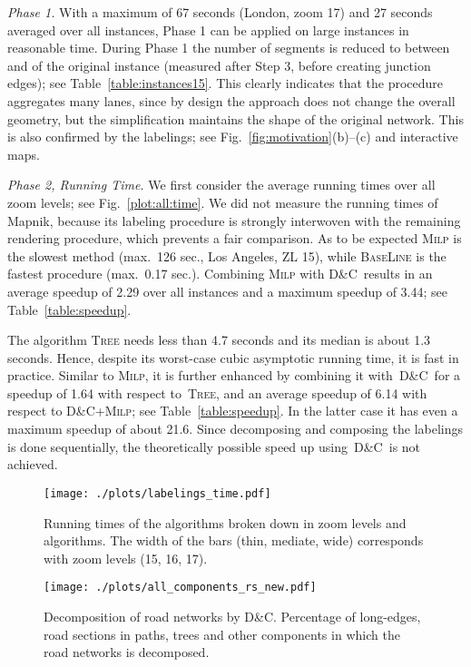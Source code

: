 \documentclass[a4paper,11pt]{article}
\newcommand{\GreedyAlgo}{\textsc{Base\-Line}\xspace}
\newcommand{\TreeAlgo}{\textsc{Tree}\xspace}
\newcommand{\ILPAlgo}{\textsc{Milp}\xspace}
\newcommand{\Shredder}{\textsc{D\&C}}
\begin{document}
\textit{Phase 1.}   With a maximum of 67 seconds (London,
zoom 17) and 27 seconds averaged over all instances, Phase 1 can be
applied on large instances in reasonable time. During Phase 1 the number of segments
is reduced to between  and  of the original instance (measured after Step 3, before creating junction edges); see
Table~\ref{table:instances15}. This clearly indicates that the
procedure aggregates many lanes, since by design the approach does not
change the overall geometry, but the simplification maintains the shape of the original network. This is also confirmed by the
labelings; see Fig.~\ref{fig:motivation}(b)--(c) and interactive maps.

\textit{Phase 2, Running Time.} We first consider the average
running times over all zoom levels; see Fig.~\ref{plot:all:time}. We
did not measure the running times of Mapnik, because its labeling
procedure is strongly interwoven with the remaining rendering
procedure, which prevents a fair comparison. As to be expected \ILPAlgo is the slowest method (max.\ 126
sec., Los Angeles, ZL 15), while \GreedyAlgo is the fastest procedure
(max.\ 0.17 sec.). Combining \ILPAlgo with \Shredder\ results in an
average speedup of 2.29 over all instances and a maximum speedup of
3.44; see Table~\ref{table:speedup}. 

The algorithm \TreeAlgo needs less than 4.7 seconds and its median is
about 1.3 seconds.  Hence, despite its worst-case cubic asymptotic
running time, it is fast in practice. Similar to \ILPAlgo, it is
further enhanced by combining it with~\Shredder\ for a speedup of 1.64
with respect to~\TreeAlgo, and an average speedup of 6.14 with respect
to \Shredder+\ILPAlgo; see Table~\ref{table:speedup}. In the latter
case it has even a maximum speedup of about 21.6.  Since decomposing
and composing the labelings is done sequentially, the theoretically
possible speed up using~\Shredder\ is not achieved.
 


\begin{figure}[t]
\centering
\texttt{[image: ./plots/labelings\_time.pdf]}
\caption{Running times of the algorithms broken down in zoom levels and algorithms. The width of the bars (thin, mediate, wide) corresponds with zoom levels (15, 16, 17). 
}
\label{fig:running-time:selection}
\end{figure}

\begin{figure}[t]
\centering
\texttt{[image: ./plots/all\_components\_rs\_new.pdf]}
\caption{
Decomposition of road networks by \Shredder. Percentage of long-edges, road sections in paths, trees and other components in which the road networks is decomposed.   }
\label{fig:components}
\end{figure}
\end{document}
